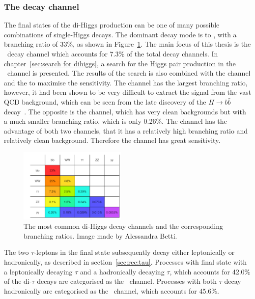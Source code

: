 \subsubsection{The \texorpdfstring{\bbtautau}{bbtautau} decay channel}
\label{sec:SM:bbtautau}

The final states of the di-Higgs production can be one of
many possible combinations of single-Higgs decays.
The dominant decay mode is to \bbbb, with a branching ratio of 33\%,
as shown in Figure~\ref{fig:SM:br}.
The main focus of this thesis is the \bbtautau\ decay channel
which accounts for 7.3\% of the total decay channels. 
In chapter~\ref{sec:search for dihiggs}, a search for the Higgs pair production 
in the \bbtautau\ channel is presented. 
The results of the search is also combined with the \bbbb channel and the \bbyy 
to maximise the sensitivity. 
The \bbbb channel has the largest branching ratio, 
however, it had been shown to be very difficult to extract the signal from 
the vast QCD background, which can be seen from the late discovery of the 
$H \rightarrow b\bar{b}$ decay~\cite{HIGG-2018-04,CMS-HIG-18-016}. 
The opposite is the \bbyy channel, which has very clean backgrounds but with 
a much smaller branching ratio, which is only 0.26\%.
The \bbtautau channel has the advantage of both two channels, that it has 
a relatively high branching ratio and relatively clean background. Therefore
the \bbtautau channel has great sensitivity. 
\begin{figure}[htbp]
    \centering
\includegraphics[width=0.47\textwidth]{theory/plots/branching-ratio.png}
\caption{The most common di-Higgs decay channels and the corresponding branching ratios. 
Image made by Alessandra Betti.  
}
\label{fig:SM:br}
\end{figure}

The two $\tau$-leptons in the final state subsequently decay either leptonically 
or hadronically, as described in section~\ref{sec:rec:tau}. 
Processes with final state with a leptonically decaying $\tau$ and a hadronically decaying $\tau$,
which accounts for 42.0\% of the di-$\tau$ decays are categorised as the \lephad\ channel.
Processes with both $\tau$ decay hadronically are categorised as the \hadhad\ channel, 
which accounts for 45.6\%.


